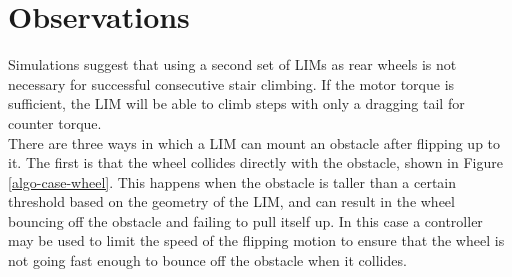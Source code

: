 
\section{Observations}

Simulations suggest that using a second set of LIMs as rear wheels is not necessary for successful consecutive stair climbing. If the motor torque is sufficient, the LIM will be able to climb steps with only a dragging tail for counter torque.\\

There are three ways in which a LIM can mount an obstacle after flipping up to it. The first is that the wheel collides directly with the obstacle, shown in Figure \ref{algo-case-wheel}. This happens when the obstacle is taller than a certain threshold based on the geometry of the LIM, and can result in the wheel bouncing off the obstacle and failing to pull itself up. In this case a controller may be used to limit the speed of the flipping motion to ensure that the wheel is not going fast enough to bounce off the obstacle when it collides. \\
%

